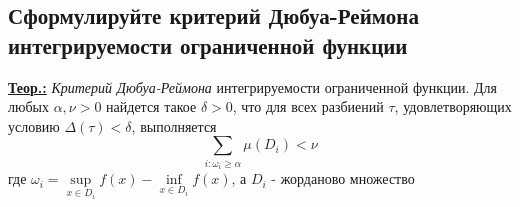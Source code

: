 
\subsection{Сформулируйте критерий Дюбуа-Реймона интегрируемости ограниченной функции}

\textbf{\underline{Теор.:} } \textit{Критерий Дюбуа-Реймона} интегрируемости ограниченной функции. Для любых $\alpha, \nu > 0$ найдется такое $\delta > 0$, что для всех разбиений $\tau$, удовлетворяющих условию $\Delta(\tau) < \delta$, выполняется
\[\sum\limits_{i: \omega_i \geqslant \alpha}\mu(D_i) < \nu\]
где $\omega_i = \sup\limits_{x \in D_i}{f(x)} - \inf\limits_{x \in D_i}{f(x)}$, а $D_i$ - жорданово множество


